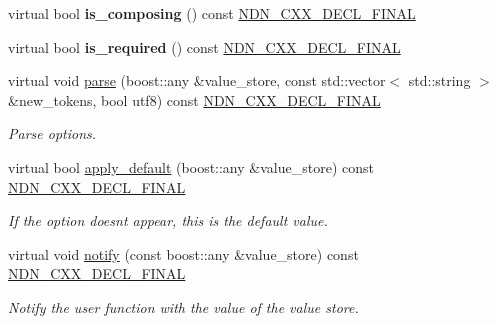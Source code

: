 \begin{DoxyCompactItemize}
\item 
virtual bool {\bfseries is\+\_\+composing} () const \hyperlink{ndn-cxx_2src_2common_8hpp_ab53a383abb72682805543301b5f2c244}{N\+D\+N\+\_\+\+C\+X\+X\+\_\+\+D\+E\+C\+L\+\_\+\+F\+I\+N\+AL}\hypertarget{classAccumulatorType_a4964e0b818e98ff6e8fadb96d38f77f8}{}\label{classAccumulatorType_a4964e0b818e98ff6e8fadb96d38f77f8}

\item 
virtual bool {\bfseries is\+\_\+required} () const \hyperlink{ndn-cxx_2src_2common_8hpp_ab53a383abb72682805543301b5f2c244}{N\+D\+N\+\_\+\+C\+X\+X\+\_\+\+D\+E\+C\+L\+\_\+\+F\+I\+N\+AL}\hypertarget{classAccumulatorType_a90bdfe69328a00e388442a2a42ce8e19}{}\label{classAccumulatorType_a90bdfe69328a00e388442a2a42ce8e19}

\item 
virtual void \hyperlink{classAccumulatorType_a3818e22be57ad168394c02419439a4c2}{parse} (boost\+::any \&value\+\_\+store, const std\+::vector$<$ std\+::string $>$ \&new\+\_\+tokens, bool utf8) const \hyperlink{ndn-cxx_2src_2common_8hpp_ab53a383abb72682805543301b5f2c244}{N\+D\+N\+\_\+\+C\+X\+X\+\_\+\+D\+E\+C\+L\+\_\+\+F\+I\+N\+AL}
\begin{DoxyCompactList}\small\item\em Parse options. \end{DoxyCompactList}\item 
virtual bool \hyperlink{classAccumulatorType_a0c73748ec3aec52a2c7f6f4010431cc9}{apply\+\_\+default} (boost\+::any \&value\+\_\+store) const \hyperlink{ndn-cxx_2src_2common_8hpp_ab53a383abb72682805543301b5f2c244}{N\+D\+N\+\_\+\+C\+X\+X\+\_\+\+D\+E\+C\+L\+\_\+\+F\+I\+N\+AL}\hypertarget{classAccumulatorType_a0c73748ec3aec52a2c7f6f4010431cc9}{}\label{classAccumulatorType_a0c73748ec3aec52a2c7f6f4010431cc9}

\begin{DoxyCompactList}\small\item\em If the option doesn\textquotesingle{}t appear, this is the default value. \end{DoxyCompactList}\item 
virtual void \hyperlink{classAccumulatorType_a7fd912aa8495013791d97e3694d032ea}{notify} (const boost\+::any \&value\+\_\+store) const \hyperlink{ndn-cxx_2src_2common_8hpp_ab53a383abb72682805543301b5f2c244}{N\+D\+N\+\_\+\+C\+X\+X\+\_\+\+D\+E\+C\+L\+\_\+\+F\+I\+N\+AL}\hypertarget{classAccumulatorType_a7fd912aa8495013791d97e3694d032ea}{}\label{classAccumulatorType_a7fd912aa8495013791d97e3694d032ea}

\begin{DoxyCompactList}\small\item\em Notify the user function with the value of the value store. \end{DoxyCompactList}\end{DoxyCompactItemize}


